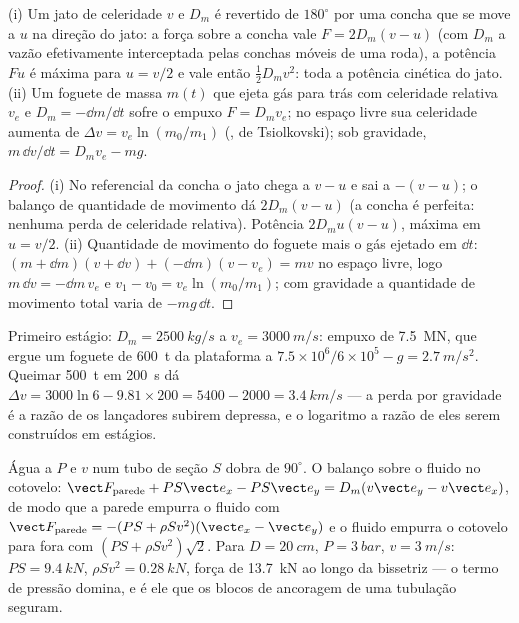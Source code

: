 \begin{proposition}\label{prop:b2:flow-balances:pelton}
(i) Um jato de celeridade $v$ e  $D_m$ é revertido de
$180^\circ$ por uma concha que se move a $u$ na direção do jato: a força
sobre a concha vale $F = 2D_m(v - u)$ (com $D_m$ a vazão efetivamente
interceptada pelas conchas móveis de uma roda), a potência $Fu$ é
máxima para $u = v/2$ e vale então $\tfrac12D_mv^2$: toda a potência
cinética do jato. (ii) Um foguete de massa $m(t)$ que ejeta gás para trás com
celeridade relativa $v_e$ e  $D_m = -\dd m/\dd t$ sofre o
empuxo $F = D_mv_e$; no espaço livre sua celeridade aumenta de
$\Delta v = v_e\ln(m_0/m_1)$ (, de Tsiolkovski); sob gravidade,
$m\,\dd v/\dd t = D_mv_e - mg$.
\end{proposition}

\begin{proof}
(i) No referencial da concha o jato chega a $v - u$ e sai a
$-(v - u)$; o balanço de quantidade de movimento dá $2D_m(v - u)$ (a concha é
perfeita: nenhuma perda de celeridade relativa). Potência $2D_mu(v - u)$, máxima em
$u = v/2$. (ii) Quantidade de movimento do foguete mais o gás ejetado em $\dd t$: $(m + \dd m)
(v + \dd v) + (-\dd m)(v - v_e) = mv$ no espaço livre, logo $m\,\dd v = -\dd m\,v_e$
e $v_1 - v_0 = v_e\ln(m_0/m_1)$; com gravidade a quantidade de movimento total varia
de $-mg\,\dd t$.
\end{proof}

\begin{example}[Um lançador]\label{ex:b2:flow-balances:rocket}
Primeiro estágio: $D_m = \qty{2500}{kg/s}$ a $v_e = \qty{3000}{m/s}$: empuxo de
\qty{7.5}{MN}, que ergue um foguete de \qty{600}{t} da plataforma a $7.5 \times 10^6/6 \times 10^5 - g
= \qty{2.7}{m/s^2}$. Queimar \qty{500}{t} em \qty{200}{s} dá
$\Delta v = 3000\ln6 - 9.81 \times 200 = 5400 - 2000 = \qty{3.4}{km/s}$ --- a
perda por gravidade é a razão de os lançadores subirem depressa, e o logaritmo a razão de eles
serem construídos em estágios.
\end{example}

\begin{example}\label{ex:b2:flow-balances:bend}
Água a $P$ e $v$ num tubo de seção $S$ dobra de $90^\circ$. O
balanço sobre o fluido no cotovelo: $\vect F_{\text{parede}} + PS\vect e_x - PS
\vect e_y = D_m(v\vect e_y - v\vect e_x)$, de modo que a parede empurra o fluido com
$\vect F_{\text{parede}} = -(PS + \rho Sv^2)(\vect e_x - \vect e_y)$ e o fluido
empurra o cotovelo para fora com $(PS + \rho Sv^2)\sqrt2$. Para $D = \qty{20}{cm}$,
$P = \qty{3}{bar}$, $v = \qty{3}{m/s}$: $PS = \qty{9.4}{kN}$, $\rho Sv^2 = \qty{0.28}{kN}$,
força de \qty{13.7}{kN} ao longo da bissetriz --- o termo de pressão domina,
e é ele que os blocos de ancoragem de uma tubulação seguram.
\end{example}

